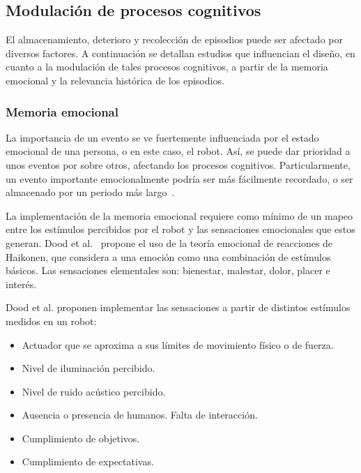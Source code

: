 \subsection{Modulación de procesos cognitivos}\label{sec:theory-modulation}

El almacenamiento, deterioro y recolección de episodios puede ser afectado por diversos factores. A continuación se detallan estudios que influencian el diseño, en cuanto a la modulación de tales procesos cognitivos, a partir de la memoria emocional y la relevancia histórica de los episodios.


\subsubsection{Memoria emocional}

La importancia de un evento se ve fuertemente influenciada por el estado emocional de una persona, o en este caso, el robot. Así, se puede dar prioridad a unos eventos por sobre otros, afectando los procesos cognitivos. Particularmente, un evento importante emocionalmente podría ser más fácilmente recordado, o ser almacenado por un periodo más largo~\cite{Deutsch2008}.

La implementación de la memoria emocional requiere como mínimo de un mapeo entre los estímulos percibidos por el robot y las sensaciones emocionales que estos generan. Dood et al.~\cite{Dodd2005} propone el uso de la teoría emocional de reacciones de Haikonen, que considera a una emoción como una combinación de estímulos básicos. Las sensaciones elementales son: bienestar, malestar, dolor, placer e interés.

Dood et al. proponen implementar las sensaciones a partir de distintos estímulos medidos en un robot:
\begin{itemize}
	\item Actuador que se aproxima a sus límites de movimiento físico o de fuerza. 
	\item Nivel de iluminación percibido.
	\item Nivel de ruido acústico percibido.
	\item Ausencia o presencia de humanos. Falta de interacción.
	\item Cumplimiento de objetivos.
	\item Cumplimiento de expectativas.
\end{itemize}


